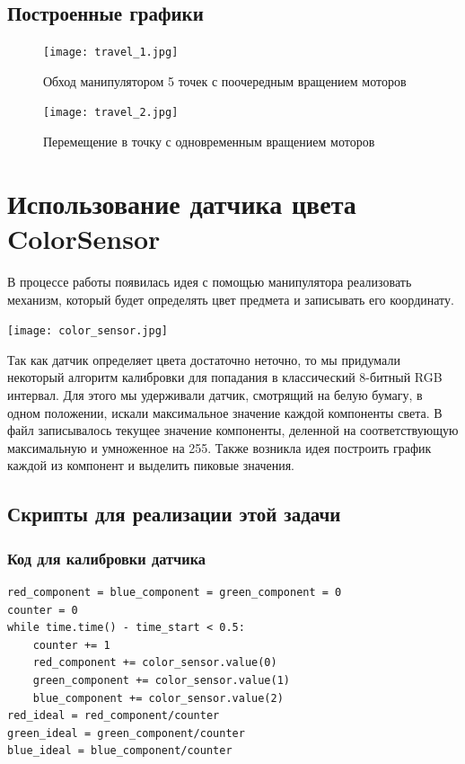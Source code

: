 \documentclass{article}
\begin{document}
\subsection{Построенные графики}
\begin{figure}[h!]
    \centering
    \texttt{[image: travel\_1.jpg]}
    \caption{Обход манипулятором 5 точек с поочередным вращением моторов}
\end{figure}
\FloatBarrier
\begin{figure}[h!]
    \centering
    \texttt{[image: travel\_2.jpg]}
    \caption{Перемещение в точку с одновременным вращением моторов}
\end{figure}
\FloatBarrier


\section{Использование датчика цвета ColorSensor}
\par В процессе работы появилась идея с помощью манипулятора реализовать механизм, который будет определять цвет предмета и записывать его координату.
\begin{floatingfigure}[l]{3.5 cm}
    \noindent
    \hfill
    \texttt{[image: color\_sensor.jpg]}
    \hfill
\end{floatingfigure}
\par Так как датчик определяет цвета достаточно неточно, то мы придумали некоторый алгоритм калибровки для попадания в классический 8-битный RGB интервал. Для этого мы удерживали датчик, смотрящий на белую бумагу, в одном положении, искали максимальное значение каждой компоненты света. В файл записывалось текущее значение компоненты, деленной на соответствующую максимальную и умноженное на 255. Также возникла идея построить график каждой из компонент и выделить пиковые значения. 


\subsection{Скрипты для реализации этой задачи}
\subsubsection*{Код для калибровки датчика}
\begin{verbatim}
red_component = blue_component = green_component = 0
counter = 0
while time.time() - time_start < 0.5:
    counter += 1
    red_component += color_sensor.value(0)
    green_component += color_sensor.value(1)
    blue_component += color_sensor.value(2)
red_ideal = red_component/counter
green_ideal = green_component/counter
blue_ideal = blue_component/counter
\end{verbatim}
\end{document}
